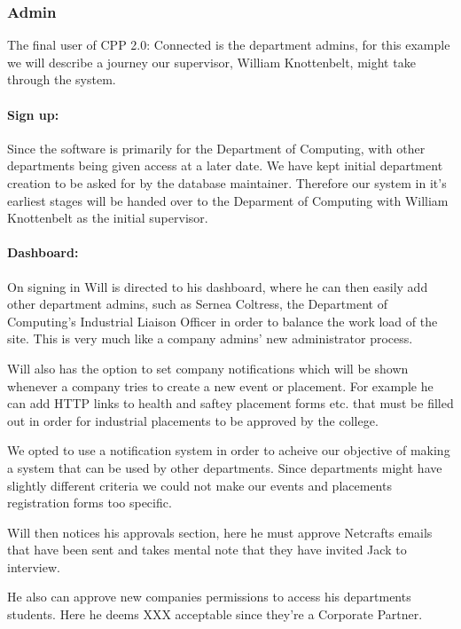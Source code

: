 \subsubsection{Admin}
  The final user of CPP 2.0: Connected is the department admins, for this example we will describe a journey our supervisor, William Knottenbelt, might take through the system.
  \paragraph{Sign up:}
    Since the software is primarily for the Department of Computing, with other departments being given access at a later date. We have kept initial department creation to be asked for by the database maintainer. 
    Therefore our system in it's earliest stages will be handed over to the Deparment of Computing with William Knottenbelt as the initial supervisor. 

  \paragraph{Dashboard:}
    On signing in Will is directed to his dashboard, where he can then easily add other department admins, such as Sernea Coltress, the Department of Computing's Industrial Liaison Officer in order to balance the work load of the site. This is very much like a company admins' new administrator process.


    Will also has the option to set company notifications which will be shown whenever a company tries to create a new event or placement. For example he can add HTTP links to health and saftey placement forms etc. that must be filled out in order for industrial placements to be approved by the college. 

    We opted to use a notification system in order to acheive our objective of making a system that can be used by other departments. Since departments might have slightly different criteria we could not make our events and placements registration forms too specific.

    Will then notices his approvals section, here he must approve Netcrafts emails that have been sent and takes mental note that they have invited Jack to interview. 

    He also can approve new companies permissions to access his departments students. Here he deems XXX acceptable since they're a Corporate Partner.

